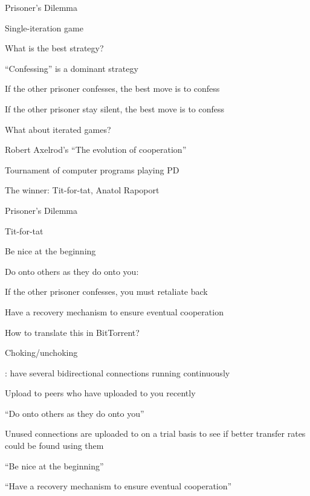 \begin{frame}{Prisoner's Dilemma}

\begin{block}{Single-iteration game}
\BIL
\item What is the best strategy?
\pause
\item “Confessing” is a dominant strategy
\BI
\item If the other prisoner confesses, the best move is to confess
\item If the other prisoner stay silent, the best move is to confess
\EI
\EIL
\end{block}

\pause
\begin{block}{What about iterated games?}
\pause
\BIL
\item Robert Axelrod's “The evolution of cooperation”
\item Tournament of computer programs playing PD
\item The winner: Tit-for-tat, Anatol Rapoport
\EIL
\end{block}

\end{frame}

\begin{frame}{Prisoner's Dilemma}

\begin{block}{Tit-for-tat}
\BI
\item Be nice at the beginning
\item Do onto others as they do onto you: 
\item If the other prisoner confesses, you must retaliate back
\item Have a recovery mechanism to ensure eventual cooperation
\EI
\end{block}

\bigskip
How to translate this in BitTorrent?

\end{frame}

\begin{frame}{Choking/unchoking}
	
: have several bidirectional connections running continuously\\
\BIL
\item Upload to peers who have uploaded to you recently
\BI
\item “Do onto others as they do onto you”
\EI
\item Unused connections are uploaded to on a trial basis to see if better transfer rates could be found using them
\BI
\item “Be nice at the beginning”
\item “Have a recovery mechanism to ensure eventual cooperation”	
\EI
\EIL
	
\end{frame}

